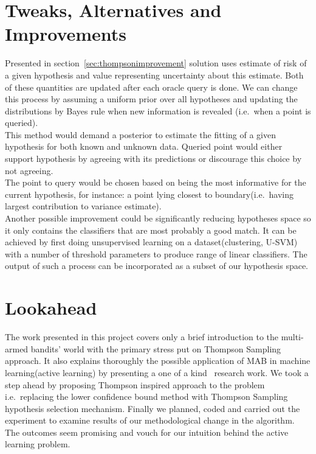 \documentclass[12pt, a4paper, pdflatex, leqno, twoside]{report}
\begin{document}
\section{Tweaks, Alternatives and Improvements\label{sec:qimprove}}
Presented in section~\ref{sec:thompsonimprovement} solution uses estimate of 
risk of a given hypothesis and value representing uncertainty about this 
estimate. Both of these quantities are updated after each oracle query is done. We 
can change this process by assuming a uniform prior over all hypotheses and 
updating the distributions by Bayes rule when new information is revealed (i.e.\ when a 
point is queried).\\
This method would demand a posterior to estimate the fitting of a given hypothesis for both 
known and unknown data. Queried point would either support hypothesis by 
agreeing with its predictions or discourage this choice by not agreeing.\\
The point to query would be chosen based on being the most informative for 
the current hypothesis, for instance: a point lying closest to boundary(i.e.\ having 
largest contribution to variance estimate).\\


Another possible improvement could be significantly reducing hypotheses
space so it only contains the classifiers that are most probably a good match. It can be achieved by
first doing unsupervised learning on a dataset(clustering, U-SVM) with a number of 
threshold parameters to produce range of linear classifiers. The output of such a 
process can be incorporated as a subset of our hypothesis space.\\


\section{Lookahead}
The work presented in this project covers only a brief introduction to the multi-armed bandits' world with the primary
stress put on Thompson Sampling approach. It also explains thoroughly the possible 
application of MAB in machine learning(active learning) by presenting a one of 
a kind~\citep{DBLP:journals/corr/GantiG13} research work. We took a step ahead by 
proposing Thompson inspired approach to the problem i.e.\ replacing the lower confidence bound 
method with Thompson Sampling hypothesis selection 
mechanism. Finally we planned, coded and carried out the experiment to examine 
results of our methodological change in the algorithm. The outcomes seem promising 
and vouch for our intuition behind the active learning problem.\\
\end{document}
